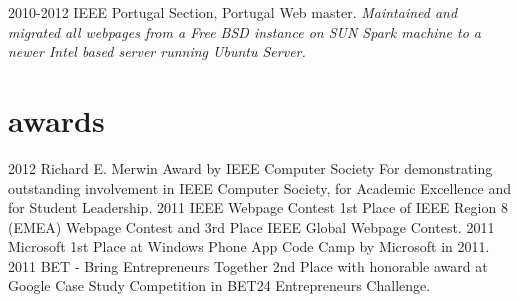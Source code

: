 \documentclass[]{friggeri-cv}
\begin{document}
\begin{entrylist}     
  \entry
    {2010-2012}
    {IEEE Portugal Section, Portugal}
    {Web master.}
    {\emph{Maintained and migrated all webpages from a Free BSD instance on SUN Spark machine to a newer Intel based server running Ubuntu Server.}}

\end{entrylist}

\section{awards}

\begin{entrylist}
  \entry
    {2012}
    {Richard E. Merwin Award by IEEE Computer Society}
    {}
    {For demonstrating outstanding involvement in IEEE Computer Society, for Academic Excellence and for Student Leadership.}
  \entry
    {2011}
    {IEEE Webpage Contest}
    { }
    {1st Place of IEEE Region 8 (EMEA) Webpage Contest and 3rd Place IEEE Global Webpage Contest.}
  \entry
    {2011}
    {Microsoft}
    {}
    {1st Place at Windows Phone App Code Camp by Microsoft in 2011.}
  \entry
    {2011}
    {BET - Bring Entrepreneurs Together}
    {}
    {2nd Place with honorable award at Google Case Study Competition in BET24 Entrepreneurs Challenge.}    
\end{entrylist}

\end{document}
